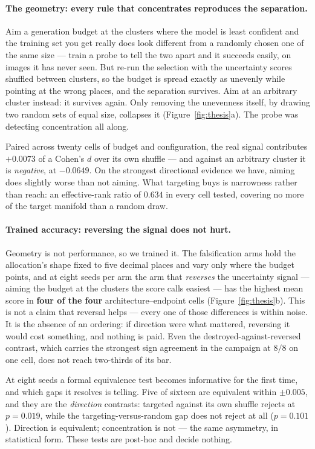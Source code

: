 \documentclass{article} %
\begin{document}
\paragraph{The geometry: every rule that concentrates reproduces the separation.} Aim a generation
budget at the clusters where the model is least confident and the training set you get really does
look different from a randomly chosen one of the same size --- train a probe to tell the two apart
and it succeeds easily, on images it has never seen. But re-run the selection with the uncertainty
scores shuffled between clusters, so the budget is spread exactly as unevenly while pointing at the
wrong places, and the separation survives. Aim at an arbitrary cluster instead: it survives again.
Only removing the unevenness itself, by drawing two random sets of equal size, collapses it
(Figure~\ref{fig:thesis}a). The probe was detecting concentration all along.

Paired across twenty cells of budget and configuration, the real signal contributes $+0.0073$ of a
Cohen's $d$ over its own shuffle --- and against an arbitrary cluster it is \emph{negative}, at
$-0.0649$. On the strongest directional evidence we have, aiming does slightly worse than not
aiming. What targeting buys is narrowness rather than reach: an effective-rank ratio of $0.634$ in
every cell tested, covering no more of the target manifold than a random draw.

\paragraph{Trained accuracy: reversing the signal does not hurt.} Geometry is not performance, so we
trained it. The falsification arms hold the allocation's shape fixed to five decimal places and vary
only where the budget points, and at eight seeds per arm the arm that \emph{reverses} the
uncertainty signal --- aiming the budget at the clusters the score calls easiest --- has the highest
mean score in \textbf{four of the four} architecture--endpoint cells (Figure~\ref{fig:thesis}b).
This is not a claim that reversal helps --- every one of those differences is within noise. It is
the absence of an ordering: if direction were what mattered, reversing it would cost something, and
nothing is paid. Even the destroyed-against-reversed contrast, which carries the strongest sign
agreement in the campaign at $8/8$ on one cell, does not reach two-thirds of its bar.

At eight seeds a formal equivalence test becomes informative for the first time, and which gaps it
resolves is telling. Five of sixteen are equivalent within $\pm 0.005$, and they are the
\emph{direction} contrasts: targeted against its own shuffle rejects at $p = 0.019$, while the
targeting-versus-random gap does not reject at all ($p = 0.101$). Direction is equivalent;
concentration is not --- the same asymmetry, in statistical form. These tests are post-hoc and
decide nothing.
\end{document}
